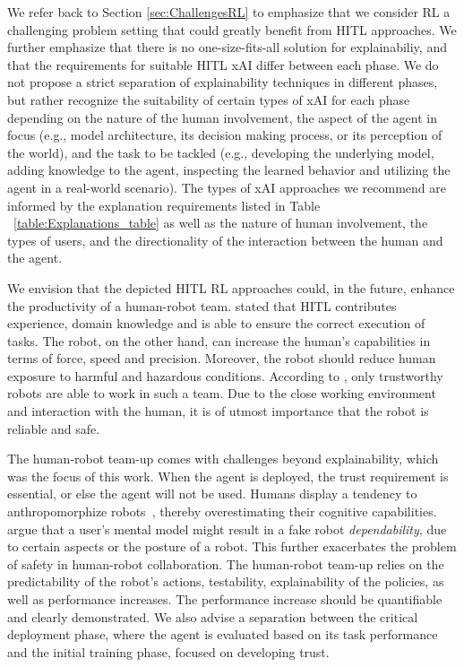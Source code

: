 \documentclass[twoside,11pt]{article}
\begin{document}
We refer back to Section \ref{sec:ChallengesRL} to emphasize that we consider RL a challenging problem setting that could greatly benefit from HITL approaches. We further emphasize that there is no one-size-fits-all solution for explainabiliy, and that the requirements for suitable HITL xAI differ between each phase. We do not propose a strict separation of explainability techniques in different phases, but rather recognize the suitability of certain types of xAI for each phase depending on the nature of the human involvement, the aspect of the agent in focus (e.g., model architecture, its decision making process, or its perception of the world), and the task to be tackled (e.g., developing the underlying model, adding knowledge to the agent, inspecting the learned behavior and utilizing the agent in a real-world scenario). The types of xAI approaches we recommend are informed by the explanation requirements listed in Table ~\ref{table:Explanations_table} as well as the nature of human involvement, the types of users, and the directionality of the interaction between the human and the agent.

We envision that the depicted HITL RL approaches could, in the future, enhance the productivity of a human-robot team. \citet{KhatibEtAl:1999:RihEnvironment} stated that HITL contributes experience, domain knowledge and is able to ensure the correct execution of tasks. The robot, on the other hand, can increase the human's capabilities in terms of force, speed and precision. Moreover, the robot should reduce human exposure to harmful and hazardous conditions. According to \citet{DeSaintsEtAl:2008:phri}, only trustworthy robots are able to work in such a team. Due to the close working environment and interaction with the human, it is of utmost importance that the robot is reliable and safe.


The human-robot team-up comes with challenges beyond explainability, which was the focus of this work. When the agent is deployed, the trust requirement is essential, or else the agent will not be used. Humans display a tendency to anthropomorphize robots~\citep{damiano2018anthropomorphism}, thereby overestimating their cognitive capabilities. \citet{DeSaintsEtAl:2008:phri} argue that a user's mental model might result in a fake robot \emph{dependability}, due to certain aspects or the posture of a robot. This further exacerbates the problem of safety in human-robot collaboration. The human-robot team-up relies on the predictability of the robot's actions, testability, explainability of the policies, as well as performance increases. The performance increase should be quantifiable and clearly demonstrated. We also advise a separation between the critical deployment phase, where the agent is evaluated based on its task performance and the initial training phase, focused on developing trust.
\end{document}
